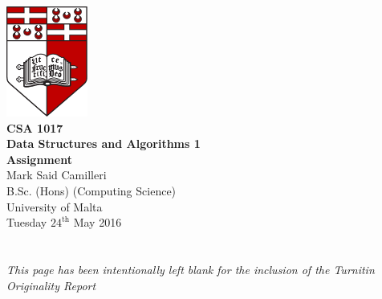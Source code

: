 \documentclass[12pt,a4paper,onesided]{report}
\begin{document}
	\begin{titlepage}
		\vspace*{\fill}
		\centering
		\includegraphics[width=0.2\textwidth]{University_of_Malta_Logo}\\
		\vspace*{3em}
		\textbf{\LARGE CSA 1017\\\vspace{0.1em}Data Structures and Algorithms 1}\\
		\vspace*{0.75em}
		\textbf{\Large Assignment}\\
		\vspace{3em}
		\large Mark Said Camilleri\\
			B.Sc. (Hons) (Computing Science)\\
			University of Malta\\
		\vspace*{1em}
		Tuesday $24^{\text{th}}$ May 2016
		\vfill
	\end{titlepage}
	\pagebreak
	\tableofcontents

\chapter*{}
\vspace{15em}
\begin{center}
\emph{This page has been intentionally left blank for the inclusion of \newline the Turnitin Originality Report} 
\end{center}
\vfill
\end{document}
